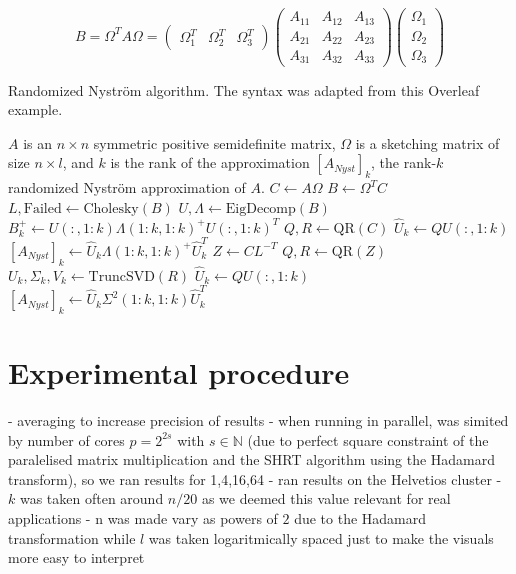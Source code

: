 \documentclass[a4paper, 12pt,oneside]{article}
\begin{document}
	$$
	B=\Omega^T A \Omega=\left(\begin{array}{lll}
		\Omega_1^T & \Omega_2^T & \Omega_3^T
		\end{array}\right)\left(\begin{array}{lll}
		A_{11} & A_{12} & A_{13} \\
		A_{21} & A_{22} & A_{23} \\
		A_{31} & A_{32} & A_{33}
		\end{array}\right)\left(\begin{array}{l}
		\Omega_1 \\
		\Omega_2 \\
		\Omega_3
		\end{array}\right)
	$$

	\begin{algorithm}
		\caption{Randomized Nystr\"om algorithm. The syntax was adapted from this Overleaf example.}\label{alg:parallel-rand-nystrom}
		\begin{algorithmic}
		\Require $A$ is an $n\times n$ symmetric positive semidefinite matrix, $\Omega$ is a sketching matrix of size $n\times l$, and $k$ is the rank of the approximation
		\Ensure $[A_{N y s t}]_k$, the rank-$k$ randomized Nystr\"om approximation of $A$. 
		\State $C \gets A \Omega$
		\State $B \gets \Omega^T C$
		\State $L, \text{Failed} \gets \text{Cholesky}(B)$ 
			\State $U, \Lambda \gets \text{EigDecomp}(B)$ 
			\State $B_k^{+} \gets U(:,1:k) \Lambda(1: k, 1: k)^{+} U(:, 1: k)^T$
			\State $Q, R \gets \text{QR}(C)$ 
			\State $\hat{U}_k \gets Q U(:, 1:k)$ 
			\State $[A_{N y s t}]_k \gets \hat{U}_k \Lambda(1: k, 1: k)^{+} \hat{U}_k^T$ 
		\Else{}
			\State $Z \gets C L^{-T}$ 
			\State $Q, R \gets \text{QR}(Z)$ 
			\State $U_k, \Sigma_k, V_k \gets \text{TruncSVD}(R)$
			\State $\hat{U}_k \gets Q U(:, 1:k)$ 
			\State $[A_{N y s t}]_k \gets \hat{U}_k \Sigma^2(1: k, 1: k) \hat{U}_k^T$ 
		\EndIf
		\end{algorithmic}
	\end{algorithm}
	
	\section{Experimental procedure}
		- averaging to increase precision of results
		- when running in parallel, was simited by number of cores $p=2^{2s}$ with $s\in\mathbb{N}$ (due to perfect square constraint of the paralelised matrix multiplication and the SHRT algorithm using the Hadamard transform), so we ran results for 1,4,16,64
		- ran results on the Helvetios cluster 
		- $k$ was taken often around $n/20$ as we deemed this value relevant for real applications
		- n was made vary as powers of $2$ due to the Hadamard transformation while $l$ was taken logaritmically spaced just to make the visuals more easy to interpret  
\end{document}

